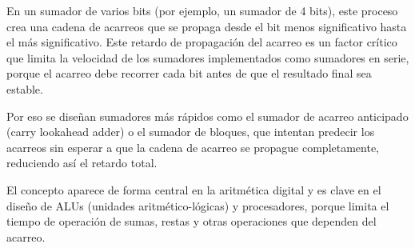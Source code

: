 En un sumador de varios bits (por ejemplo, un sumador de 4 bits), este proceso crea una cadena de acarreos que se propaga desde el bit menos significativo hasta el más significativo. Este retardo de propagación del acarreo es un factor crítico que limita la velocidad de los sumadores implementados como sumadores en serie, porque el acarreo debe recorrer cada bit antes de que el resultado final sea estable.

Por eso se diseñan sumadores más rápidos como el sumador de acarreo anticipado (carry lookahead adder) o el sumador de bloques, que intentan predecir los acarreos sin esperar a que la cadena de acarreo se propague completamente, reduciendo así el retardo total.

El concepto aparece de forma central en la aritmética digital y es clave en el diseño de ALUs (unidades aritmético-lógicas) y procesadores, porque limita el tiempo de operación de sumas, restas y otras operaciones que dependen del acarreo.